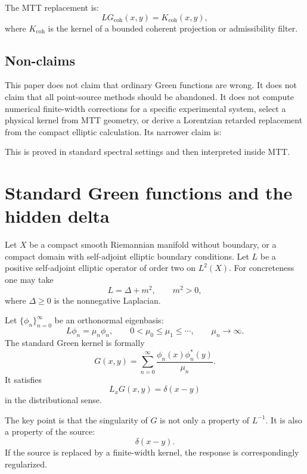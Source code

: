 \documentclass[11pt]{article}
\begin{document}
The MTT replacement is:
\begin{equation}
LG_{\mathrm{coh}}(x,y)=K_{\mathrm{coh}}(x,y),
\end{equation}
where \(K_{\mathrm{coh}}\) is the kernel of a bounded coherent projection or admissibility filter.

\subsection*{Non-claims}

This paper does not claim that ordinary Green functions are wrong. It does not claim that all point-source methods should be abandoned. It does not compute numerical finite-width corrections for a specific experimental system, select a physical kernel from MTT geometry, or derive a Lorentzian retarded replacement from the compact elliptic calculation. Its narrower claim is:
\begin{center}
\end{center}
This is proved in standard spectral settings and then interpreted inside MTT.

\section{Standard Green functions and the hidden delta}

Let \(X\) be a compact smooth Riemannian manifold without boundary, or a compact domain with self-adjoint elliptic boundary conditions. Let \(L\) be a positive self-adjoint elliptic operator of order two on \(L^2(X)\). For concreteness one may take
\[
L=\Delta+m^2,\qquad m^2>0,
\]
where \(\Delta\ge 0\) is the nonnegative Laplacian.

Let \(\{ \phi_n\}_{n=0}^\infty\) be an orthonormal eigenbasis:
\[
L\phi_n=\mu_n\phi_n,\qquad 0<\mu_0\le \mu_1\le\cdots,\qquad \mu_n\to\infty.
\]
The standard Green kernel is formally
\begin{equation}
G(x,y)=\sum_{n=0}^\infty \frac{\phi_n(x)\phi_n^*(y)}{\mu_n}.
\end{equation}
It satisfies
\begin{equation}
L_xG(x,y)=\delta(x-y)
\end{equation}
in the distributional sense.

The key point is that the singularity of \(G\) is not only a property of \(L^{-1}\). It is also a property of the source:
\[
\delta(x-y).
\]
If the source is replaced by a finite-width kernel, the response is correspondingly regularized.
\end{document}
